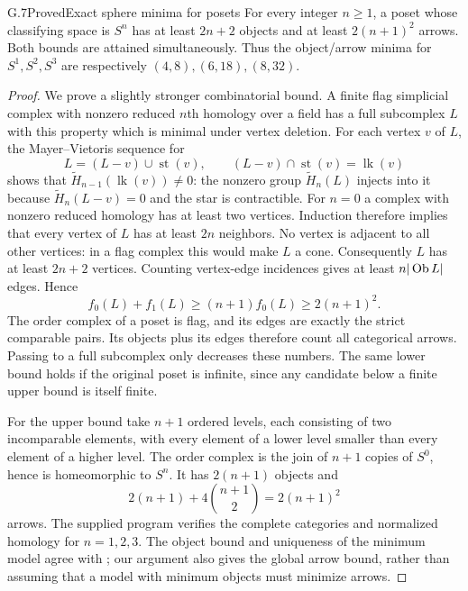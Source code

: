 \begin{claim}{G.7}{Proved}{Exact sphere minima for posets}
For every integer $n\geq1$, a poset whose classifying space is $S^n$ has at least $2n+2$ objects and at least $2(n+1)^2$ arrows. Both bounds are attained simultaneously. Thus the object/arrow minima for $S^1,S^2,S^3$ are respectively $(4,8),(6,18),(8,32)$.
\end{claim}
\begin{proof}
We prove a slightly stronger combinatorial bound. A finite flag simplicial complex with nonzero reduced $n$th homology over a field has a full subcomplex $L$ with this property which is minimal under vertex deletion. For each vertex $v$ of $L$, the Mayer--Vietoris sequence for
\[
        L=(L-v)\cup\operatorname{st}(v),\qquad
        (L-v)\cap\operatorname{st}(v)=\operatorname{lk}(v)
\]
shows that $\widetilde H_{n-1}(\operatorname{lk}(v))\ne0$: the nonzero group $\widetilde H_n(L)$ injects into it because $\widetilde H_n(L-v)=0$ and the star is contractible. For $n=0$ a complex with nonzero reduced homology has at least two vertices. Induction therefore implies that every vertex of $L$ has at least $2n$ neighbors. No vertex is adjacent to all other vertices: in a flag complex this would make $L$ a cone. Consequently $L$ has at least $2n+2$ vertices. Counting vertex-edge incidences gives at least $n|\operatorname{Ob} L|$ edges. Hence
\[
                   f_0(L)+f_1(L)\geq(n+1)f_0(L)
                                         \geq2(n+1)^2.
\]
The order complex of a poset is flag, and its edges are exactly the strict comparable pairs. Its objects plus its edges therefore count all categorical arrows. Passing to a full subcomplex only decreases these numbers. The same lower bound holds if the original poset is infinite, since any candidate below a finite upper bound is itself finite.

For the upper bound take $n+1$ ordered levels, each consisting of two incomparable elements, with every element of a lower level smaller than every element of a higher level. The order complex is the join of $n+1$ copies of $S^0$, hence is homeomorphic to $S^n$. It has $2(n+1)$ objects and
\[
             2(n+1)+4\binom{n+1}{2}=2(n+1)^2
\]
arrows. The supplied program verifies the complete categories and normalized homology for $n=1,2,3$. The object bound and uniqueness of the minimum model agree with \citet[Theorem 2.13 and Corollary 2.14]{BarmakMinian2006}; our argument also gives the global arrow bound, rather than assuming that a model with minimum objects must minimize arrows.
\end{proof}

